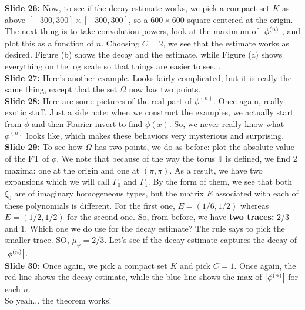 \documentclass[11pt]{article}
\begin{document}
\noindent \textbf{Slide 26:} Now, to see if the decay estimate works, we pick a compact set $K$ as above $[-300,300]\times [-300,300]$, so a $600\times 600$ square centered at the origin. The next thing is to take convolution powers, look at the maximum of $\abs{\phi^{(n)}}$, and plot this as a function of $n$. Choosing $C=2$, we see that the estimate works as desired. Figure (b) shows the decay and the estimate, while Figure (a) shows everything on the log scale so that things are easier to see...\\




\noindent \textbf{Slide 27:} Here's another example. Looks fairly complicated, but it is really the same thing, except that the set $\Omega$ now has two points.\\



\noindent \textbf{Slide 28:} Here are some pictures of the real part of $\phi^{(n)}$. Once again, really exotic stuff. Just a side note: when we construct the examples, we actually start from $\widehat{\phi}$ and then Fourier-invert to find $\phi(x)$. So, we never really know what $\phi^{(n)}$ looks like, which makes these behaviors very mysterious and surprising.  \\


\noindent \textbf{Slide 29:} To see how $\Omega$ has two points, we do as before: plot the absolute value of the FT of $\phi$. We note that because of the way the torus $\mathbb{T}$ is defined, we find 2 maxima: one at the origin and one at $(\pi,\pi)$. As a result, we have two expansions which we will call $\Gamma_{0}$ and $\Gamma_1$. By the form of them, we see that both $\xi_0$ are of imaginary homogeneous types, but the matrix $E$ associated with each of these polynomials is different. For the first one, $E = (1/6, 1/2)$ whereas $E= (1/2,1/2)$ for the second one. So, from before, we have \textbf{two traces:} 2/3 and 1. Which one we do use for the decay estimate? The rule says to pick the smaller trace. SO, $\mu_\phi = 2/3$. Let's see if the decay estimate captures the decay of $\abs{\phi^{(n)}}$. \\


\noindent \textbf{Slide 30:} Once again, we pick a compact set $K$ and pick $C=1$. Once again, the red line shows the decay estimate, while the blue line shows the max of $\abs{\phi^{(n)}}$ for each $n$. \\

So yeah... the theorem works!\\
\end{document}
